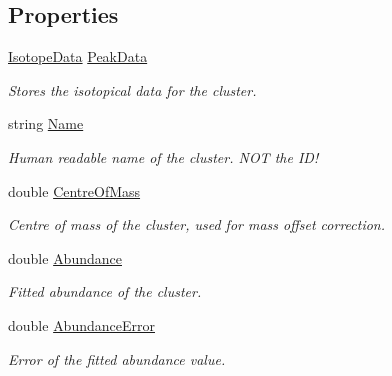 \subsection*{Properties}
\begin{DoxyCompactItemize}
\item 
\mbox{\hyperlink{class_isotope_fit_1_1_i_f_data_1_1_cluster_1_1_isotope_data}{Isotope\+Data}} \mbox{\hyperlink{class_isotope_fit_1_1_i_f_data_1_1_cluster_a9874ca075e89c301587ef9cdc1d7a5c6}{Peak\+Data}}
\begin{DoxyCompactList}\small\item\em Stores the isotopical data for the cluster. \end{DoxyCompactList}\item 
string \mbox{\hyperlink{class_isotope_fit_1_1_i_f_data_1_1_cluster_a8ae80358415b5637dbe46d2a211d03e7}{Name}}
\begin{DoxyCompactList}\small\item\em Human readable name of the cluster. N\+OT the I\+D! \end{DoxyCompactList}\item 
double \mbox{\hyperlink{class_isotope_fit_1_1_i_f_data_1_1_cluster_a43d9e77aebe1e02b617b16aff448c613}{Centre\+Of\+Mass}}
\begin{DoxyCompactList}\small\item\em Centre of mass of the cluster, used for mass offset correction. \end{DoxyCompactList}\item 
double \mbox{\hyperlink{class_isotope_fit_1_1_i_f_data_1_1_cluster_ac7dbcceda366fd00ce0c12f1cdd35fea}{Abundance}}
\begin{DoxyCompactList}\small\item\em Fitted abundance of the cluster. \end{DoxyCompactList}\item 
double \mbox{\hyperlink{class_isotope_fit_1_1_i_f_data_1_1_cluster_a3658f5cbf7c18d18af2164998c30661f}{Abundance\+Error}}
\begin{DoxyCompactList}\small\item\em Error of the fitted abundance value. \end{DoxyCompactList}\item 

\end{DoxyCompactItemize}
